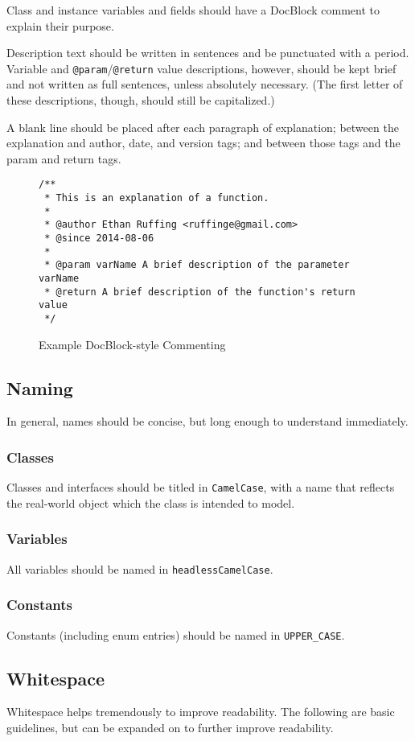 \documentclass[12pt,letter]{memoir} %
\begin{document}
			Class and instance variables and fields should have a DocBlock
			comment to explain their purpose.

			Description text should be written in sentences and be punctuated
			with a period. Variable and \texttt{@param}/\texttt{@return} value
			descriptions, however, should be kept brief and not written as full
			sentences, unless absolutely necessary. (The first letter of these
			descriptions, though, should still be capitalized.)

			A blank line should be placed after each paragraph of explanation;
			between the explanation and author, date, and version tags; and
			between those tags and the param and return tags.
			\begin{figure}[h!]
				\label{lst:docblock-oop}
				\caption{Example DocBlock-style Commenting}
				\lstset{language=Java}
				\begin{lstlisting}
/**
 * This is an explanation of a function.
 *
 * @author Ethan Ruffing <ruffinge@gmail.com>
 * @since 2014-08-06
 *
 * @param varName A brief description of the parameter varName
 * @return A brief description of the function's return value
 */
				\end{lstlisting}
			\end{figure}
		\subsection{Naming}
			In general, names should be concise, but long enough to understand
			immediately.
			\subsubsection{Classes}
				Classes and interfaces should be titled in \texttt{CamelCase},
				with a name that reflects the real-world object which the class
				is intended to model.
			\subsubsection{Variables}
				All variables should be named in \texttt{headlessCamelCase}.
			\subsubsection{Constants}
				Constants (including enum entries) should be named in
				\texttt{UPPER\_CASE}.
		\subsection{Whitespace}
			Whitespace helps tremendously to improve readability. The following
			are basic guidelines, but can be expanded on to further improve
			readability.
\end{document}
